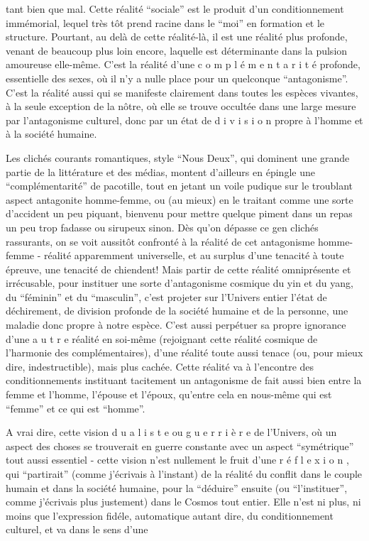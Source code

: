 
tant bien que mal. Cette réalité ``sociale'' est le produit d'un conditionnement immémorial, lequel très tôt prend racine dans le ``moi'' en formation et le structure. Pourtant, au delà de cette réalité-là, il est une réalité plus profonde, venant de beaucoup plus loin encore, laquelle est déterminante dans la pulsion amoureuse elle-même. C'est la réalité d'une c o m p l é m e n t a r i t é profonde, essentielle des sexes, où il n'y a nulle place pour un quelconque ``antagonisme''. C'est la réalité aussi qui se manifeste clairement dans toutes les espèces vivantes, à la seule exception de la nôtre, où elle se trouve occultée dans une large mesure par l'antagonisme culturel, donc par un état de d i v i s i o n propre à l'homme et à la société humaine.

Les clichés courants romantiques, style ``Nous Deux'', qui dominent une grande partie de la littérature et des médias, montent d'ailleurs en épingle une ``complémentarité'' de pacotille, tout en jetant un voile pudique sur le troublant aspect antagonite homme-femme, ou (au mieux) en le traitant comme une sorte d'accident un peu piquant, bienvenu pour mettre quelque piment dans un repas un peu trop fadasse ou sirupeux sinon. Dès qu'on dépasse ce gen clichés rassurants, on se voit aussitôt confronté à la réalité de cet antagonisme homme-femme - réalité apparemment universelle, et au surplus d'une tenacité à toute épreuve, une tenacité de chiendent! Mais \hspace{.6em}partir de cette réalité omniprésente et irrécusable, pour instituer une sorte d'antagonisme cosmique du yin et du yang, du ``féminin'' et du ``masculin'', c'est projeter sur l'Univers entier l'état de déchirement, de division profonde de la société humaine et de la personne, une maladie donc propre à notre espèce. C'est aussi perpétuer sa propre ignorance d'une a u t r e réalité en soi-même (rejoignant cette réalité cosmique de l'harmonie des complémentaires), d'une réalité toute aussi tenace (ou, pour mieux dire, indestructible), mais plus cachée. Cette réalité va à l'encontre des conditionnements instituant tacitement un antagonisme de fait aussi bien entre la femme et l'homme, l'épouse et l'époux, qu'entre cela en nous-même qui est ``femme'' et ce qui est ``homme''.

A vrai dire, cette vision d u a l i s t e ou g u e r r i è r e de l'Univers, où un aspect des choses se trouverait en guerre constante avec un aspect ``symétrique'' tout aussi essentiel - cette vision n'est nullement le fruit d'une r é f l e x i o n , qui ``partirait'' (comme j'écrivais à l'instant) de la réalité du conflit dans le couple humain et dans la société humaine, pour la ``déduire'' ensuite (ou ``l'instituer'', comme j'écrivais plus justement) dans le Cosmos tout entier. Elle n'est ni plus, ni moins que l'expression fidéle, automatique autant dire, du conditionnement culturel, et va dans le sens d'une

